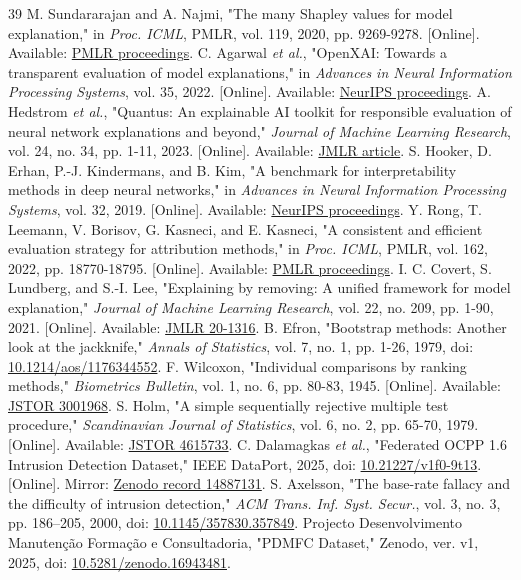 \documentclass[journal,letterpaper]{IEEEtran}
\begin{document}
\begin{thebibliography}{39}
 M. Sundararajan and A. Najmi, "The many Shapley values for model explanation," in \emph{Proc. ICML}, PMLR, vol. 119, 2020, pp. 9269-9278. [Online]. Available: \href{https://proceedings.mlr.press/v119/sundararajan20b.html}{PMLR proceedings}.
 C. Agarwal \emph{et al.}, "OpenXAI: Towards a transparent evaluation of model explanations," in \emph{Advances in Neural Information Processing Systems}, vol. 35, 2022. [Online]. Available: \href{https://papers.neurips.cc/paper_files/paper/2022/hash/65398a0eba88c9b4a1c38ae405b125ef-Abstract-Datasets_and_Benchmarks.html}{NeurIPS proceedings}.
 A. Hedstrom \emph{et al.}, "Quantus: An explainable AI toolkit for responsible evaluation of neural network explanations and beyond," \emph{Journal of Machine Learning Research}, vol. 24, no. 34, pp. 1-11, 2023. [Online]. Available: \href{https://jmlr.org/papers/v24/22-0142.html}{JMLR article}.
 S. Hooker, D. Erhan, P.-J. Kindermans, and B. Kim, "A benchmark for interpretability methods in deep neural networks," in \emph{Advances in Neural Information Processing Systems}, vol. 32, 2019. [Online]. Available: \href{https://proceedings.neurips.cc/paper_files/paper/2019/hash/fe4b8556000d0f0cae99daa5c5c5a410-Abstract.html}{NeurIPS proceedings}.
 Y. Rong, T. Leemann, V. Borisov, G. Kasneci, and E. Kasneci, "A consistent and efficient evaluation strategy for attribution methods," in \emph{Proc. ICML}, PMLR, vol. 162, 2022, pp. 18770-18795. [Online]. Available: \href{https://proceedings.mlr.press/v162/rong22a.html}{PMLR proceedings}.
 I. C. Covert, S. Lundberg, and S.-I. Lee, "Explaining by removing: A unified framework for model explanation," \emph{Journal of Machine Learning Research}, vol. 22, no. 209, pp. 1-90, 2021. [Online]. Available: \href{https://jmlr.org/papers/v22/20-1316.html}{JMLR 20-1316}.
 B. Efron, "Bootstrap methods: Another look at the jackknife," \emph{Annals of Statistics}, vol. 7, no. 1, pp. 1-26, 1979, doi: \href{https://doi.org/10.1214/aos/1176344552}{10.1214/aos/1176344552}.
 F. Wilcoxon, "Individual comparisons by ranking methods," \emph{Biometrics Bulletin}, vol. 1, no. 6, pp. 80-83, 1945. [Online]. Available: \href{https://www.jstor.org/stable/3001968}{JSTOR 3001968}.
 S. Holm, "A simple sequentially rejective multiple test procedure," \emph{Scandinavian Journal of Statistics}, vol. 6, no. 2, pp. 65-70, 1979. [Online]. Available: \href{https://www.jstor.org/stable/4615733}{JSTOR 4615733}.
 C. Dalamagkas \emph{et al.}, "Federated OCPP 1.6 Intrusion Detection Dataset," IEEE DataPort, 2025, doi: \href{https://doi.org/10.21227/v1f0-9t13}{10.21227/v1f0-9t13}. [Online]. Mirror: \href{https://zenodo.org/records/14887131}{Zenodo record 14887131}.
 S. Axelsson, "The base-rate fallacy and the difficulty of intrusion detection," \textit{ACM Trans. Inf. Syst. Secur.}, vol. 3, no. 3, pp. 186--205, 2000, doi: \href{https://doi.org/10.1145/357830.357849}{10.1145/357830.357849}.
 Projecto Desenvolvimento Manuten\c{c}\~ao Forma\c{c}\~ao e Consultadoria, "PDMFC Dataset," Zenodo, ver. v1, 2025, doi: \href{https://doi.org/10.5281/zenodo.16943481}{10.5281/zenodo.16943481}.
\end{thebibliography}
\end{document}
